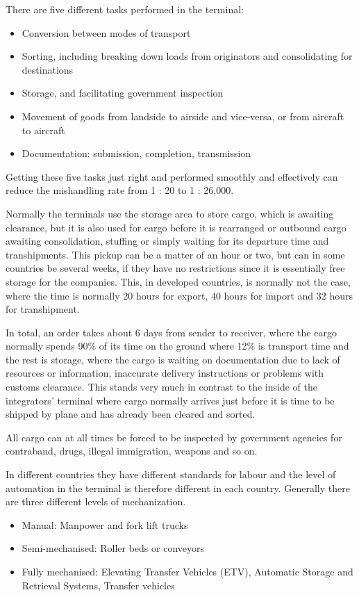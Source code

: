 There are five different tasks performed in the terminal:
\begin{itemize}
\item Conversion between modes of transport
\item Sorting, including breaking down loads from originators and consolidating for destinations
\item Storage, and facilitating government inspection
\item Movement of goods from landside to airside and vice-versa, or from aircraft to aircraft
\item Documentation: submission, completion, transmission
\end{itemize}

Getting these five tasks just right and performed smoothly and effectively can reduce the mishandling rate from 1 : 20 to 1 : 26,000.

Normally the terminals use the storage area to store cargo, which is awaiting clearance, but it is also used for cargo before it is rearranged or outbound cargo awaiting consolidation, stuffing or simply waiting for its departure time and transhipments. This pickup can be a matter of an hour or two, but can in some countries be several weeks, if they have no restrictions since it is essentially free storage for the companies. This, in developed countries, is normally not the case, where the time is normally 20 hours for export, 40 hours for import and 32 hours for transhipment. %

In total, an order takes about 6 days from sender to receiver, where the cargo normally spends 90\% of its time on the ground where 12\% is transport time and the rest is storage, where the cargo is waiting on documentation due to lack of resources or information, inaccurate delivery instructions or problems with customs clearance. This stands very much in contrast to the inside of the integrators' terminal where cargo normally arrives just before it is time to be shipped by plane and has already been cleared and sorted.%

All cargo can at all times be forced to be inspected by government agencies for contraband, drugs, illegal immigration, weapons and so on.

In different countries they have different standards for labour and the level of automation in the terminal is therefore different in each country. Generally there are three different levels of mechanization.
\begin{itemize}
\item Manual: Manpower and fork lift trucks
\item Semi-mechanised: Roller beds or conveyors
\item Fully mechanised: Elevating Transfer Vehicles (ETV), Automatic Storage and Retrieval Systems, Transfer vehicles
\end{itemize}

